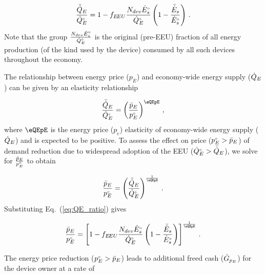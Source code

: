 \begin{equation} \label{eq:QE_ratio}
  \frac{\bar{\dot{Q}}_E}{{}{\dot{Q}}^{\scriptscriptstyle \circ}_E} =
        1 - f_{E\!EU} \frac{N_{dev} {}{\dot{E}}^{\scriptscriptstyle \circ}_s}{{}{\dot{Q}}^{\scriptscriptstyle \circ}_E} \left( 1 - \frac{\bar{\dot{E}}_s}{{}{\dot{E}}^{\scriptscriptstyle \circ}_s}  \right) \, .
\end{equation}
%
Note that the group $\frac{N_{dev} {}{\dot{E}}^{\scriptscriptstyle \circ}_s}{{}{\dot{Q}}^{\scriptscriptstyle \circ}_E}$
is the original (pre-EEU) fraction of all energy production
(of the kind used by the device)
consumed by all such devices throughout the economy.

The relationship between energy price ($p_E$) and
economy-wide energy supply ($\dot{Q}_E$)
can be given by an elasticity relationship

\begin{equation}
  \frac{\rainc{Q}_E}{\rorig{Q}_E} = 
          \left( \frac{\ainc{p}_E}{\orig{p}_E} \right)^{\eQEpE} \, ,
\end{equation}
%
where $\eQEpE$ is the energy price ($p_e$) elasticity
of economy-wide energy supply ($\dot{Q}_E$)
and is expected to be positive.
To assess the effect on price
(${}{p}^{\scriptscriptstyle \circ}_E > \bar{p}_E$)
of demand reduction
due to widespread adoption of the EEU
(${}{\dot{Q}}^{\scriptscriptstyle \circ}_E > \bar{\dot{Q}}_E$),
we solve for $\frac{\bar{p}_E}{{}{p}^{\scriptscriptstyle \circ}_E}$
to obtain

\begin{equation}
  \frac{\ainc{p}_E}{\orig{p}_E} =
        \left( \frac{\rainc{Q}_E}{\rorig{Q}_E} \right)^{\frac{1}{\eQEpE}} \, .
\end{equation}
%
Substituting Eq.~(\ref{eq:QE_ratio}) gives

\begin{equation} \label{eq:price_effect_price_ratio}
  \frac{\ainc{p}_E}{\orig{p}_E} =
        \left[ 1 - f_{\EEU} \frac{N_{dev} \rbempl{E}_s}{\rbempl{Q}_E} \left( 1 - \frac{\rainc{E}_s}{\rbempl{E}_s}  \right) \right]^{\frac{1}{\eQEpE}} \, .
\end{equation}

The energy price reduction (${}{p}^{\scriptscriptstyle \circ}_E > \bar{p}_E$)
leads to additional freed cash ($\dot{G}_{p_E}$) 
for the device owner at a rate of

